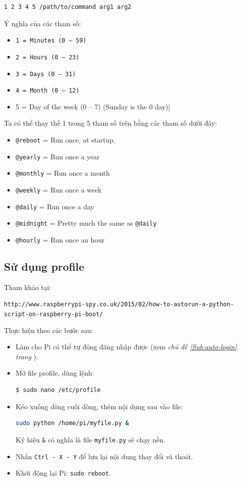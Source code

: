 \begin{lstlisting}[language=bash]
1 2 3 4 5 /path/to/command arg1 arg2
\end{lstlisting}
Ý nghĩa của các tham số:
\begin{itemize}
\item \verb|1 = Minutes (0 – 59)|
\item \verb|2 = Hours (0 – 23)|
\item \verb|3 = Days (0 – 31)|
\item \verb|4 = Month (0 – 12)|
\item 5 = Day of the week (0 – 7) (Sunday is the 0 day)|
\end{itemize}
Ta có thể thay thế 1 trong 5 tham số trên bằng các tham số dưới đây:
\begin{itemize}
\item \verb|@reboot|	= Run once, at startup.
\item \verb|@yearly|	= Run once a year
\item \verb|@monthly| = Run once a month
\item \verb|@weekly|	= Run once a week
\item \verb|@daily| = Run once a day
\item \verb|@midnight| = Pretty much the same as \verb|@daily|
\item \verb|@hourly|	= Run once an hour
\end{itemize}
\subsection{Sử dụng profile}
Tham khảo tại:

\begin{footnotesize}
\verb|http://www.raspberrypi-spy.co.uk/2015/02/how-to-autorun-a-python-script-on-raspberry-pi-boot/|
\end{footnotesize}

Thực hiện theo các bước sau:
\begin{itemize}
\item Làm cho Pi có thể tự động đăng nhập được (xem \textit{chủ đề \ref{Sub:auto-login} trang \pageref{Sub:auto-login}}).
\item Mở file profile, dùng lệnh: 
\begin{lstlisting}[language=bash]
$ sudo nano /etc/profile
\end{lstlisting}
\item Kéo xuống dòng cuối dòng, thêm nội dụng sau vào file:
\begin{lstlisting}[language=bash]
sudo python /home/pi/myfile.py &
\end{lstlisting}
Ký hiệu \verb|&| có nghĩa là file \verb|myfile.py| sẽ chạy nền.
\item Nhấn \verb|Ctrl - X - Y| để lưu lại nội dung thay đổi và thoát.
\item Khởi động lại Pi: \verb|sudo reboot|.
\end{itemize}
